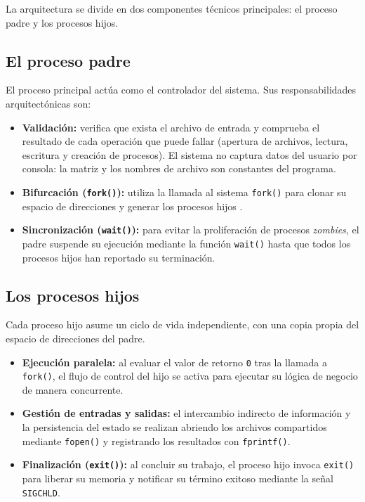 La arquitectura se divide en dos componentes técnicos principales: el proceso padre y los procesos hijos.

\subsection{El proceso padre}
El proceso principal actúa como el controlador del sistema. Sus responsabilidades arquitectónicas son:

\begin{itemize}[leftmargin=*]
    \item \textbf{Validación:} verifica que exista el archivo de entrada y comprueba el resultado de cada operación que puede fallar (apertura de archivos, lectura, escritura y creación de procesos). El sistema no captura datos del usuario por consola: la matriz y los nombres de archivo son constantes del programa.
    \item \textbf{Bifurcación (\texttt{fork()}):} utiliza la llamada al sistema \texttt{fork()} para clonar su espacio de direcciones y generar los procesos hijos \cite{marquez:unix-programacion:2015}.
    \item \textbf{Sincronización (\texttt{wait()}):} para evitar la proliferación de procesos \textit{zombies}, el padre suspende su ejecución mediante la función \texttt{wait()} hasta que todos los procesos hijos han reportado su terminación.
\end{itemize}

\subsection{Los procesos hijos}
Cada proceso hijo asume un ciclo de vida independiente, con una copia propia del espacio de direcciones del padre.

\begin{itemize}[leftmargin=*]
    \item \textbf{Ejecución paralela:} al evaluar el valor de retorno \texttt{0} tras la llamada a \texttt{fork()}, el flujo de control del hijo se activa para ejecutar su lógica de negocio de manera concurrente.
    \item \textbf{Gestión de entradas y salidas:} el intercambio indirecto de información y la persistencia del estado se realizan abriendo los archivos compartidos mediante \texttt{fopen()} y registrando los resultados con \texttt{fprintf()}.
    \item \textbf{Finalización (\texttt{exit()}):} al concluir su trabajo, el proceso hijo invoca \texttt{exit()} para liberar su memoria y notificar su término exitoso mediante la señal \texttt{SIGCHLD}.
\end{itemize}

